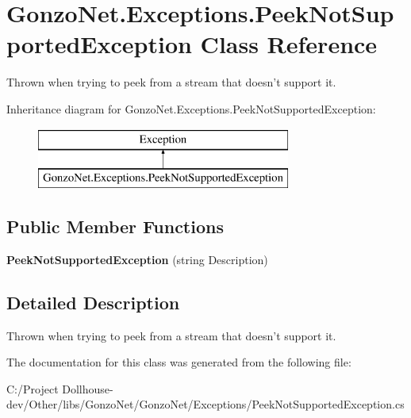 \hypertarget{class_gonzo_net_1_1_exceptions_1_1_peek_not_supported_exception}{\section{Gonzo\+Net.\+Exceptions.\+Peek\+Not\+Supported\+Exception Class Reference}
\label{class_gonzo_net_1_1_exceptions_1_1_peek_not_supported_exception}
}


Thrown when trying to peek from a stream that doesn't support it.  


Inheritance diagram for Gonzo\+Net.\+Exceptions.\+Peek\+Not\+Supported\+Exception\+:\begin{figure}[H]
\begin{center}
\leavevmode
\includegraphics[height=2.000000cm]{class_gonzo_net_1_1_exceptions_1_1_peek_not_supported_exception}
\end{center}
\end{figure}
\subsection*{Public Member Functions}
\begin{DoxyCompactItemize}
\item 
\hypertarget{class_gonzo_net_1_1_exceptions_1_1_peek_not_supported_exception_af349a206b7e38e38ce99e0ec52a10963}{{\bfseries Peek\+Not\+Supported\+Exception} (string Description)}\label{class_gonzo_net_1_1_exceptions_1_1_peek_not_supported_exception_af349a206b7e38e38ce99e0ec52a10963}

\end{DoxyCompactItemize}


\subsection{Detailed Description}
Thrown when trying to peek from a stream that doesn't support it. 



The documentation for this class was generated from the following file\+:\begin{DoxyCompactItemize}
\item 
C\+:/\+Project Dollhouse-\/dev/\+Other/libs/\+Gonzo\+Net/\+Gonzo\+Net/\+Exceptions/Peek\+Not\+Supported\+Exception.\+cs\end{DoxyCompactItemize}
